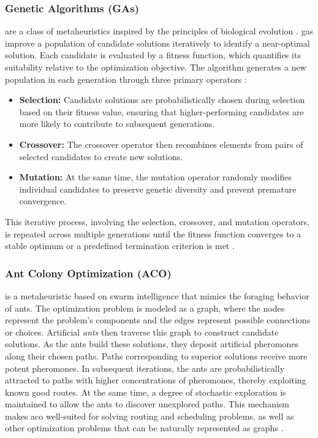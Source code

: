 \subsubsection{Genetic Algorithms (GAs)}
 are a class of metaheuristics inspired by the principles of biological evolution \cite{holland_adaptation_1992}.
\glspl{ga} improve a population of candidate solutions iteratively to identify a near-optimal solution.
Each candidate is evaluated by a fitness function, which quantifies its suitability relative to the optimization objective. 
The algorithm generates a new population in each generation through three primary operators \cite{holland_adaptation_1992}: 

\begin{itemize}
    \item \textbf{Selection:} Candidate solutions are probabilistically chosen during selection based on their fitness value, ensuring that higher-performing candidates are more likely to contribute to subsequent generations. 
    \item \textbf{Crossover:} The crossover operator then recombines elements from pairs of selected candidates to create new solutions.
    \item \textbf{Mutation:} At the same time, the mutation operator randomly modifies individual candidates to preserve genetic diversity and prevent premature convergence. 
\end{itemize}

This iterative process, involving the selection, crossover, and mutation operators, is repeated across multiple generations until the fitness function converges to a stable optimum or a predefined termination criterion is met \cite{holland_adaptation_1992}.

\subsubsection{Ant Colony Optimization (ACO)}
 is a metaheuristic based on swarm intelligence that mimics the foraging behavior of ants.
The optimization problem is modeled as a graph, where the nodes represent the problem's components and the edges represent possible connections or choices.
Artificial \textit{ants} then traverse this graph to construct candidate solutions.
As the ants build these solutions, they deposit artificial pheromones along their chosen paths.
Paths corresponding to superior solutions receive more potent pheromones.
In subsequent iterations, the ants are probabilistically attracted to paths with higher concentrations of pheromones, thereby exploiting known good routes.
At the same time, a degree of stochastic exploration is maintained to allow the ants to discover unexplored paths.
This mechanism makes \gls{aco} well-suited for solving routing and scheduling problems, as well as other optimization problems that can be naturally represented as graphs \cite{dorigo_ant_1997}.

